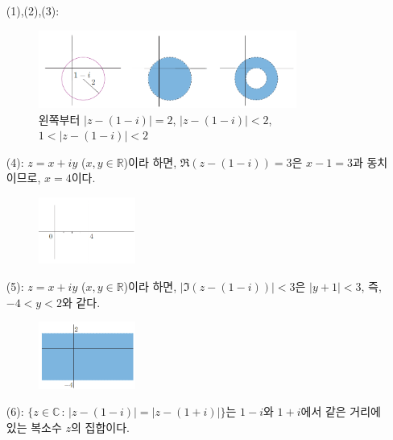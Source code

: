 \begin{itemize}
\item[(1),(2),(3):] \
\begin{figure}[h!]
\begin{center}
\includegraphics[width=0.8\textwidth]{./Solution/figs/fig-5-7}
\end{center}
\caption{왼쪽부터 $|z-(1-i)|=2$, $|z-(1-i)|<2$,
$1<|z-(1-i)|<2$}
\label{fig-5-7}
\end{figure}
\item[(4):] $z=x+iy$ ($x,y\in\mathbb R$)이라 하면,
$\Re(z-(1-i))=3$은 $x-1=3$과 동치이므로, $x=4$이다.
\begin{figure}[h!]
\begin{center}
\includegraphics[width=0.3\textwidth]{./Solution/figs/fig-s-0-2}
\end{center}
\end{figure}
\item[(5):] $z=x+iy$ ($x,y\in\mathbb R$)이라 하면,
$|\Im(z-(1-i))|<3$은 $|y+1|<3$, 즉, $-4<y<2$와 같다.
\begin{figure}[h!]
\begin{center}
\includegraphics[width=0.3\textwidth]{./Solution/figs/fig-s-0-3}
\end{center}
\end{figure}
\item[(6):] $\{ z\in\mathbb C\,:\, |z-(1-i)| = |z-(1+i)|\}$는
$1-i$와 $1+i$에서 같은 거리에 있는 복소수 $z$의 집합이다.

\end{itemize}
